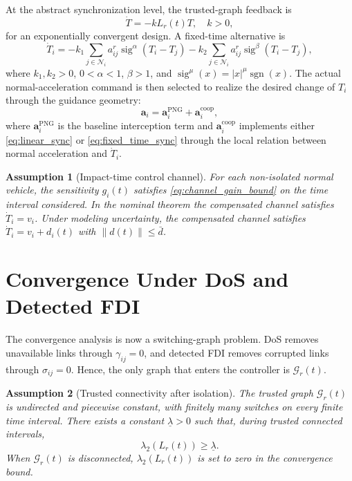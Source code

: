 \documentclass[lettersize,journal]{IEEEtran}
\newtheorem{assumption}{Assumption}
\begin{document}
At the abstract synchronization level, the trusted-graph feedback is
\begin{equation}
    \dot T
    =
    -k L_r(t)T,
    \quad k>0,
    \label{eq:linear_sync}
\end{equation}
for an exponentially convergent design. A fixed-time alternative is
\begin{equation}
    \dot T_i
    =
    -k_1
    \sum_{j\in\mathcal{N}_i}
    a_{ij}^{r}
    \operatorname{sig}^{\alpha}(T_i-T_j)
    -k_2
    \sum_{j\in\mathcal{N}_i}
    a_{ij}^{r}
    \operatorname{sig}^{\beta}(T_i-T_j),
    \label{eq:fixed_time_sync}
\end{equation}
where $k_1,k_2>0$, $0<\alpha<1$, $\beta>1$, and $\operatorname{sig}^{\mu}(x)=|x|^\mu\operatorname{sgn}(x)$. The actual normal-acceleration command is then selected to realize the desired change of $T_i$ through the guidance geometry:
\begin{equation}
    \bm a_i
    =
    \bm a_i^{\mathrm{PNG}}
    +
    \bm a_i^{\mathrm{coop}},
    \label{eq:guidance_command}
\end{equation}
where $\bm a_i^{\mathrm{PNG}}$ is the baseline interception term and $\bm a_i^{\mathrm{coop}}$ implements either \eqref{eq:linear_sync} or \eqref{eq:fixed_time_sync} through the local relation between normal acceleration and $\dot T_i$.

\begin{assumption}[Impact-time control channel]
For each non-isolated normal vehicle, the sensitivity $g_i(t)$ satisfies \eqref{eq:channel_gain_bound} on the time interval considered. In the nominal theorem the compensated channel satisfies $\dot T_i=v_i$. Under modeling uncertainty, the compensated channel satisfies $\dot T_i=v_i+d_i(t)$ with $\|d(t)\|\le \bar d$.
\end{assumption}

\section{Convergence Under DoS and Detected FDI}

The convergence analysis is now a switching-graph problem. DoS removes unavailable links through $\gamma_{ij}=0$, and detected FDI removes corrupted links through $\sigma_{ij}=0$. Hence, the only graph that enters the controller is $\mathcal{G}_r(t)$.

\begin{assumption}[Trusted connectivity after isolation]
The trusted graph $\mathcal{G}_r(t)$ is undirected and piecewise constant, with finitely many switches on every finite time interval. There exists a constant $\underline{\lambda}>0$ such that, during trusted connected intervals,
\begin{equation}
    \lambda_2(L_r(t))\ge \underline{\lambda}.
    \label{eq:lambda_lower}
\end{equation}
When $\mathcal{G}_r(t)$ is disconnected, $\lambda_2(L_r(t))$ is set to zero in the convergence bound.
\end{assumption}
\end{document}
